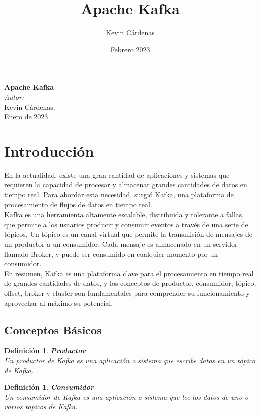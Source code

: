 \documentclass{article}
\title{Apache Kafka}
\author{Kevin Cárdenas}
\date{Febrero 2023}
\newtheorem{defi}[propo]{Definición}
\begin{document}
\begin{titlepage}
\begin{center}
{\Huge \textbf{Apache Kafka}}
\\[18cm]

\large\emph{Autor:}\\
Kevin Cárdenas.
\\[1cm]
{\large Enero de 2023}

\end{center}
\end{titlepage}
\newpage
\tableofcontents
\newpage
\section{Introducción}
En la actualidad, existe una gran cantidad de aplicaciones y sistemas que requieren la capacidad de procesar y almacenar grandes cantidades de datos en tiempo real. Para abordar esta necesidad, surgió Kafka, una plataforma de procesamiento de flujos de datos en tiempo real.\\

Kafka es una herramienta altamente escalable, distribuida y tolerante a fallas, que permite a los usuarios producir y consumir eventos a través de una serie de tópicos. Un tópico es un canal virtual que permite la transmisión de mensajes de un productor a un consumidor. Cada mensaje es almacenado en un servidor llamado Broker, y puede ser consumido en cualquier momento por un consumidor.\\

En resumen, Kafka es una plataforma clave para el procesamiento en tiempo real de grandes cantidades de datos, y los conceptos de productor, consumidor, tópico, offset, broker y cluster son fundamentales para comprender su funcionamiento y aprovechar al máximo su potencial.\\

\subsection{Conceptos Básicos}
\begin{defi}\textbf{Productor}\\
Un productor de Kafka es una aplicación o sistema que escribe datos
en un tópico de Kafka.
\end{defi}

\begin{defi}\textbf{Consumidor}\\
Un consumidor de Kafka es una aplicación o sistema que lee los datos de uno o varios topicos de Kafka.
\end{defi}
\end{document}
